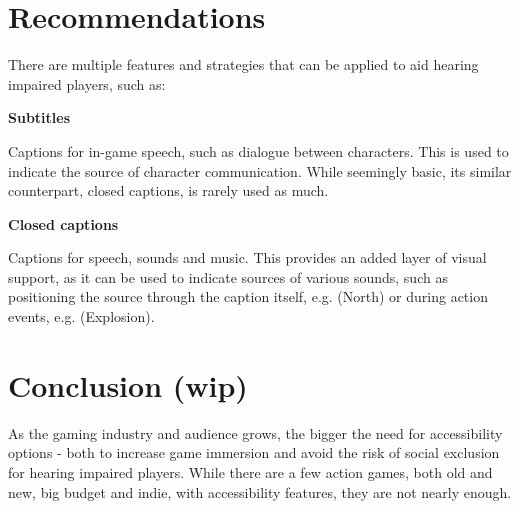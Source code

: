 \documentclass{scrartcl}
\begin{document}
\section{Recommendations}
There are multiple features and strategies that can be applied to aid hearing impaired players, such as:

\textbf{Subtitles}

Captions for in-game speech, such as dialogue between characters. This is used to indicate the source of character communication. While seemingly basic, its similar counterpart, closed captions, is rarely used as much.

\textbf{Closed captions}

Captions for speech, sounds and music. This provides an added layer of visual support, as it can be used to indicate sources of various sounds, such as positioning the source through the caption itself, e.g. (North) or during action events, e.g. (Explosion). 

\section{Conclusion (wip)}

As the gaming industry and audience grows, the bigger the need for accessibility options - both to increase game immersion and avoid the risk of social exclusion for hearing impaired players. While there are a few action games, both old and new, big budget and indie, with accessibility features, they are not nearly enough. 



\end{document}

